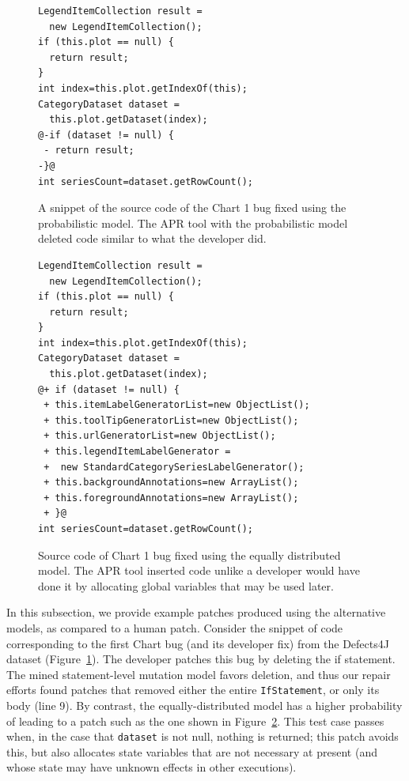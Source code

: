 \documentclass[conference]{IEEEtran}
\begin{document}
\begin{figure}[t]
\begin{lstlisting}[frame=single,style=base]
LegendItemCollection result = 
  new LegendItemCollection();
if (this.plot == null) {
  return result;
}
int index=this.plot.getIndexOf(this);
CategoryDataset dataset = 
  this.plot.getDataset(index);
@-if (dataset != null) {
 - return result;
-}@
int seriesCount=dataset.getRowCount();
	\end{lstlisting}
	\caption{A snippet of the source code of the Chart 1 bug fixed using the
      probabilistic model. The APR tool with the probabilistic model deleted code similar to what the
      developer did.\label{fig:chart1.1}}
\end{figure}

\begin{figure}[t]
\begin{lstlisting}[frame=single,style=base]
LegendItemCollection result = 
  new LegendItemCollection();
if (this.plot == null) {
  return result;
}
int index=this.plot.getIndexOf(this);
CategoryDataset dataset = 
  this.plot.getDataset(index);
@+ if (dataset != null) { 
 + this.itemLabelGeneratorList=new ObjectList();
 + this.toolTipGeneratorList=new ObjectList();
 + this.urlGeneratorList=new ObjectList();
 + this.legendItemLabelGenerator = 
 +  new StandardCategorySeriesLabelGenerator();
 + this.backgroundAnnotations=new ArrayList();
 + this.foregroundAnnotations=new ArrayList();
 + }@
int seriesCount=dataset.getRowCount();
	\end{lstlisting}
	\caption{Source code of Chart 1 bug fixed using the equally distributed
      model. The APR tool inserted code unlike a developer would have done it by
      allocating global variables that may be used later.\label{fig:chart1.3}}

\end{figure}


In this subsection, we provide example patches produced using the alternative
models, as compared to a human patch.  Consider the snippet of code corresponding
to the first Chart bug (and its developer fix) from the Defects4J dataset
(Figure~\ref{fig:chart1.1}).  The developer patches this bug by deleting the if
statement.  The mined statement-level mutation model favors deletion, and thus
our repair efforts found patches that removed either the entire \texttt{IfStatement}, or only its body (line 9).
By contrast, the equally-distributed model has a higher probability of leading
to a patch such as the one shown in Figure~\ref{fig:chart1.3}.  This test case
passes when, in the case that \texttt{dataset} is not null, nothing is returned;
this patch avoids this, but also allocates state variables that are not
necessary at present (and whose state may have unknown effects in other
executions). 
\end{document}
